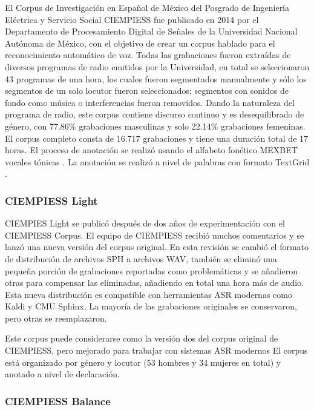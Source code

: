 El Corpus de Investigación en Español de México del Posgrado de Ingeniería Eléctrica y Servicio Social CIEMPIESS \cite{CIEMPIESS} fue publicado en 2014 por el Departamento de Procesamiento Digital de Señales de la Universidad Nacional Autónoma de México, con el objetivo de crear un corpus hablado para el reconocimiento automático de voz. Todas las grabaciones fueron extraídas de diversos programas de radio emitidos por la Universidad, en total se seleccionaron 43 programas de una hora, los cuales fueron segmentados manualmente y sólo los segmentos de un solo locutor fueron seleccionados; segmentos con sonidos de fondo como música o interferencias fueron removidos. Dando la naturaleza del programa de radio, este corpus contiene discurso continuo y es desequilibrado de género, con 77.86\% grabaciones masculinas y solo 22.14\% grabaciones femeninas. El corpus completo consta de 16.717 grabaciones y tiene una duración total de 17 horas. El proceso de anotación se realizó usando el alfabeto fonético MEXBET vocales tónicas \cite{mexbet}. La anotación se realizó a nivel de palabras con formato TextGrid \cite{TextGrids}.

\subsubsection{CIEMPIESS Light}

CIEMPIES Light \cite{CIEMPIESS-LIGHT} se publicó después de dos años de experimentación con el CIEMPIESS Corpus. El equipo de CIEMPIESS recibió muchos comentarios y se lanzó una nueva versión del corpus original. En esta revisión se cambió el formato de distribución de archivos SPH a archivos WAV, también se eliminó una pequeña porción de grabaciones reportadas como problemáticas y se añadieron otras para compensar las eliminadas, añadiendo en total una hora m\'as de audio. Esta nueva distribución es compatible con herramientas ASR modernas como Kaldi y CMU Sphinx. La mayoría de las grabaciones originales se conservaron, pero otras se reemplazaron. 

Este corpus puede considerarse como la versión dos del corpus original de CIEMPIESS, pero mejorado para trabajar con sistemas ASR modernos El corpus está organizado por género y locutor (53 hombres y 34 mujeres en total) y anotado a nivel de declaración. 

\subsubsection{CIEMPIESS Balance}

